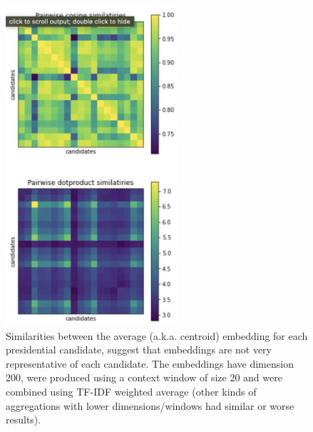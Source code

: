 \documentclass[11pt]{article}
\begin{document}
\begin{figure}[t]
  \label{fig:labeled_centroids}
\centering
  \includegraphics[width=2.5in]{figures/word2vecs.png}
  \caption{Similarities between the average (a.k.a. centroid) embedding for each presidential candidate, suggest that embeddings are not very representative of each candidate. The embeddings have dimension 200, were produced using a context window of size 20 and were combined using TF-IDF weighted average (other kinds of aggregations with lower dimensions/windows had similar or worse results).}
\end{figure}
\end{document}
